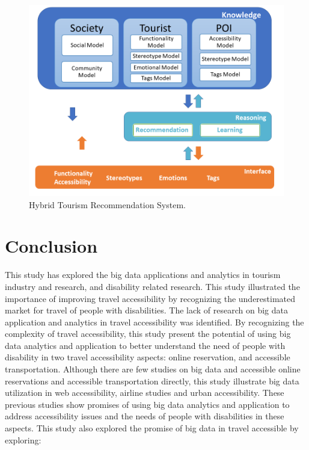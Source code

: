 \begin{figure}[htb]
  \centering\includegraphics[width=\columnwidth]{images/rec.png}
  \caption{Hybrid Tourism Recommendation System\cite{Santos2018}.}\label{F:rec}
\end{figure}

\section{Conclusion}

This study has explored the big data applications and analytics  in tourism industry and 
research, and disability related research. This study illustrated the importance of 
improving travel accessibility by recognizing the underestimated market for travel of
people with disabilities. The lack of research on big data application and analytics 
in travel accessibility was identified. By recognizing the complexity of travel 
accessibility, this study present the potential of using big data analytics and 
application to better understand the need of people with disability 
in two travel accessibility aspects: online reservation, and accessible 
transportation. Although there are few studies on big data and accessible 
online reservations and accessible transportation directly, this study 
illustrate big data utilization in web accessibility, airline studies and urban 
accessibility. These previous studies show promises of using big data analytics 
and application to address accessibility issues and the needs of people with 
disabilities in these aspects. This study also explored the promise of big 
data in travel accessible by exploring:

